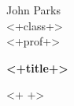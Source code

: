 \documentclass[11pt, letterpaper, notitlepage]{article}
\begin{document}
John Parks\\
<+class+>\\
<+prof+>

\begin{center}
{\Large \textbf{<+title+>}} 
\end{center}

\hrulefill
<+ +>

\hrulefill
\end{document}
